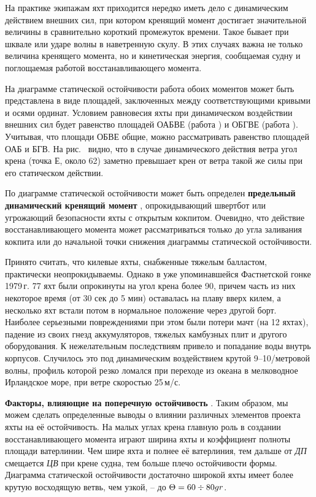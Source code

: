 На практике экипажам яхт приходится нередко иметь дело с динамическим
действием внешних сил, при котором кренящий момент достигает
значительной величины в сравнительно короткий промежуток
времени. Такое бывает при шквале или ударе волны в наветренную
скулу. В этих случаях важна не только величина кренящего момента, но и
кинетическая энергия, сообщаемая судну и поглощаемая работой
восстанавливающего момента.

На диаграмме статической остойчивости работа обоих моментов может быть
представлена в виде площадей, заключенных между соответствующими
кривыми и осями ординат. Условием равновесия яхты при динамическом
воздействии внешних сил будет равенство площадей ОАБВЕ (работа
) и ОБГВЕ (работа ). Учитывая, что площади ОБВЕ
общие, можно рассматривать равенство площадей ОАБ и БГВ. На
рис.~ видно, что в случае динамического действия ветра угол
крена (точка Е, около 62\gr) заметно превышает крен от ветра такой же
силы при его статическом действии.

По диаграмме статической остойчивости может быть определен
\textbf{предельный динамический кренящий момент}
, опрокидывающий
швертбот или угрожающий безопасности яхты с открытым
кокпитом. Очевидно, что действие восстанавливающего момента может
рассматриваться только до угла заливания кокпита или до начальной
точки снижения диаграммы статической остойчивости.

Принято считать, что килевые яхты, снабженные тяжелым балластом,
практически неопрокидываемы. Однако в уже упоминавшейся Фастнетской
гонке 1979\,г. 77 яхт были опрокинуты на угол крена более 90\gr,
причем часть из них некоторое время (от 30 сек до 5 мин) оставалась на
плаву вверх килем, а несколько яхт встали потом в нормальное положение
через другой борт. Наиболее серьезными повреждениями при этом были
потери мачт (на 12 яхтах), падение из своих гнезд аккумуляторов,
тяжелых камбузных плит и другого оборудования. К нежелательным
последствиям привело и попадание воды внутрь корпусов. Случилось это
под динамическим воздействием крутой 9--10\-/метровой волны, профиль
которой резко ломался при переходе из океана в мелководное Ирландское
море, при ветре скоростью 25\,м/с.

\textbf{Факторы, влияющие на поперечную остойчивость}
. Таким образом,
мы можем сделать определенные выводы о влиянии различных элементов
проекта яхты на её остойчивость. На малых углах крена главную роль в
создании восстанавливающего момента играют ширина яхты и коэффициент
полноты площади ватерлинии. Чем шире яхта и полнее её ватерлиния, тем
дальше от \textit{ДП} смещается \textit{ЦВ} при крене судна, тем
больше плечо остойчивости формы. Диаграмма статической остойчивости
достаточно широкой яхты имеет более крутую восходящую ветвь, чем
узкой, \--- до $\Theta = 60 \div 80gr$.

